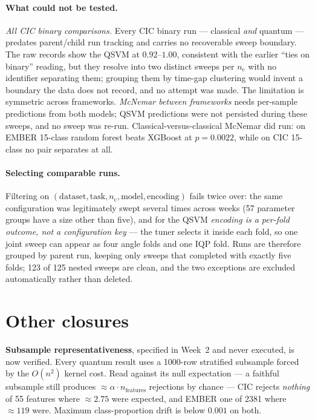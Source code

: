 \documentclass[10pt]{article}
\newcommand{\nc}{\ensuremath{n_{\mathrm{c}}}}
\begin{document}
\paragraph{What could not be tested.} \emph{All CIC binary comparisons.} Every
CIC binary run --- classical \emph{and} quantum --- predates parent/child run
tracking and carries no recoverable sweep boundary. The raw records show the
QSVM at $0.92$--$1.00$, consistent with the earlier ``ties on binary'' reading,
but they resolve into two distinct sweeps per \nc{} with no identifier
separating them; grouping them by time-gap clustering would invent a boundary
the data does not record, and no attempt was made. The limitation is symmetric
across frameworks. \emph{McNemar between frameworks} needs per-sample
predictions from both models; QSVM predictions were not persisted during these
sweeps, and no sweep was re-run. Classical-versus-classical McNemar did run: on
EMBER 15-class random forest beats XGBoost at $p=0.0022$, while on CIC 15-class
no pair separates at all.

\paragraph{Selecting comparable runs.} Filtering on
$(\text{dataset},\text{task},\nc{},\text{model},\text{encoding})$ fails twice
over: the same configuration was legitimately swept several times across weeks
(57 parameter groups have a size other than five), and for the QSVM
\emph{encoding is a per-fold outcome, not a configuration key} --- the tuner
selects it inside each fold, so one joint sweep can appear as four angle folds
and one IQP fold. Runs are therefore grouped by parent run, keeping only sweeps
that completed with exactly five folds; 123 of 125 nested sweeps are clean, and
the two exceptions are excluded automatically rather than deleted.

\section{Other closures}

\textbf{Subsample representativeness}, specified in Week~2 and never executed,
is now verified. Every quantum result uses a 1000-row stratified subsample
forced by the $O(n^2)$ kernel cost. Read against its null expectation --- a
faithful subsample still produces $\approx\alpha\cdot n_{\mathrm{features}}$
rejections by chance --- CIC rejects \emph{nothing} of 55 features where
$\approx 2.75$ were expected, and EMBER one of 2381 where $\approx 119$ were.
Maximum class-proportion drift is below $0.001$ on both.
\end{document}
